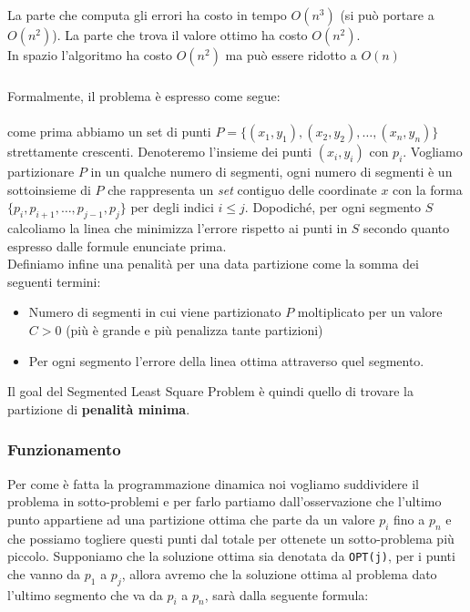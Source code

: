 La parte che computa gli errori ha costo in tempo $O(n^3)$ (si può portare a
$O(n^2)$).
La parte che trova il valore ottimo ha costo $O(n^2)$.\\

In spazio l'algoritmo ha costo $O(n^2)$ ma può essere ridotto a $O(n)$

\subsubsection{\goal}

Formalmente, il problema è espresso come segue:

\paragraph*{} come prima abbiamo un set di punti $P = \{(x_1, y_1), (x_2, y_2),
    \ldots, (x_n, y_n)\}$ strettamente crescenti. Denoteremo l'insieme dei punti
$(x_i, y_i)$ con $p_i$. Vogliamo partizionare $P$ in un qualche numero di
segmenti, ogni numero di segmenti è un sottoinsieme di $P$ che rappresenta un
\textit{set} contiguo delle coordinate $x$ con la forma $\{p_i, p_{i+1}, \ldots,
    p_{j-1}, p_j\}$ per degli indici $i \leq j$. Dopodiché, per ogni segmento $S$
calcoliamo la linea che minimizza l'errore rispetto ai punti in $S$ secondo
quanto espresso dalle formule enunciate prima.\\

Definiamo infine una penalità per una data partizione come la somma dei seguenti
termini:

\begin{itemize}
    \item Numero di segmenti in cui viene partizionato $P$ moltiplicato per un
          valore $C > 0$ (più è grande e più penalizza tante partizioni)
    \item Per ogni segmento l'errore della linea ottima attraverso quel
          segmento.
\end{itemize}


Il goal del Segmented Least Square Problem è quindi quello di trovare la
partizione di \textbf{penalità minima}.

\subsubsection{Funzionamento}

Per come è fatta la programmazione dinamica noi vogliamo suddividere il problema
in sotto-problemi e per farlo partiamo dall'osservazione che l'ultimo punto
appartiene ad una partizione ottima che parte da un valore $p_i$ fino a $p_n$ e
che possiamo togliere questi punti dal totale per ottenete un sotto-problema più
piccolo. Supponiamo che la soluzione ottima sia denotata da \verb|OPT(j)|, per i
punti che vanno da $p_1$ a $p_j$, allora avremo che la soluzione ottima al
problema dato l'ultimo segmento che va da $p_i$ a $p_n$, sarà dalla seguente
formula:

